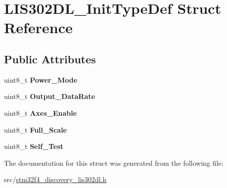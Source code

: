 \hypertarget{struct_l_i_s302_d_l___init_type_def}{\section{L\-I\-S302\-D\-L\-\_\-\-Init\-Type\-Def Struct Reference}
\label{struct_l_i_s302_d_l___init_type_def}
}
\subsection*{Public Attributes}
\begin{DoxyCompactItemize}
\item 
\hypertarget{struct_l_i_s302_d_l___init_type_def_ade0365a8a52a00d4e07f6060a9f6fca8}{uint8\-\_\-t {\bfseries Power\-\_\-\-Mode}}\label{struct_l_i_s302_d_l___init_type_def_ade0365a8a52a00d4e07f6060a9f6fca8}

\item 
\hypertarget{struct_l_i_s302_d_l___init_type_def_a9e904cffbe2be0a76ce86da572f4d1d1}{uint8\-\_\-t {\bfseries Output\-\_\-\-Data\-Rate}}\label{struct_l_i_s302_d_l___init_type_def_a9e904cffbe2be0a76ce86da572f4d1d1}

\item 
\hypertarget{struct_l_i_s302_d_l___init_type_def_a2858db02fb8fc4dfcd31e1df5808bab3}{uint8\-\_\-t {\bfseries Axes\-\_\-\-Enable}}\label{struct_l_i_s302_d_l___init_type_def_a2858db02fb8fc4dfcd31e1df5808bab3}

\item 
\hypertarget{struct_l_i_s302_d_l___init_type_def_a81c7d2915315b1ebbf91530726206328}{uint8\-\_\-t {\bfseries Full\-\_\-\-Scale}}\label{struct_l_i_s302_d_l___init_type_def_a81c7d2915315b1ebbf91530726206328}

\item 
\hypertarget{struct_l_i_s302_d_l___init_type_def_a549044b115c9329a556e823a278693e6}{uint8\-\_\-t {\bfseries Self\-\_\-\-Test}}\label{struct_l_i_s302_d_l___init_type_def_a549044b115c9329a556e823a278693e6}

\end{DoxyCompactItemize}


The documentation for this struct was generated from the following file\-:\begin{DoxyCompactItemize}
\item 
src/\hyperlink{stm32f4__discovery__lis302dl_8h}{stm32f4\-\_\-discovery\-\_\-lis302dl.\-h}\end{DoxyCompactItemize}
